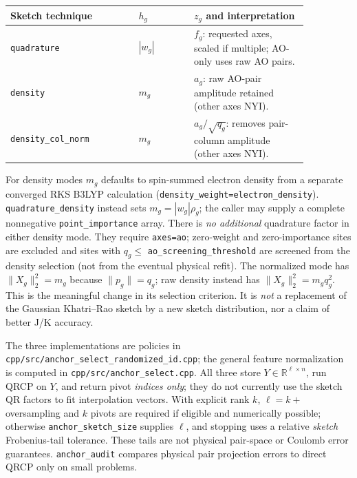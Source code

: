 \documentclass[10pt,a4paper]{article}
\newcommand{\code}[1]{\texttt{#1}}
\begin{document}
\begin{center}
\small
\begin{tabular}{@{}p{0.37\linewidth}p{0.16\linewidth}p{0.33\linewidth}@{}}
\toprule
Sketch technique & $h_g$ & $z_g$ and interpretation \\
\midrule
\code{quadrature} & $|w_g|$ & $f_g$: requested axes, scaled if multiple; AO-only uses raw AO pairs. \\
\code{density} & $m_g$ & $a_g$: raw AO-pair amplitude retained (other axes NYI). \\
\code{density\_col\_norm} & $m_g$ & $a_g/\sqrt{q_g}$: removes pair-column amplitude (other axes NYI). \\
\bottomrule
\end{tabular}
\end{center}
For density modes $m_g$ defaults to spin-summed electron density from a
separate converged RKS B3LYP calculation (\code{density\_weight=electron\_density}).
\code{quadrature\_density} instead sets $m_g=|w_g|\rho_g$; the caller may
supply a complete nonnegative \code{point\_importance} array. There is
\emph{no additional} quadrature factor in either density mode. They require
\code{axes=ao}; zero-weight and zero-importance sites are excluded and sites
with $q_g\leq$ \code{ao\_screening\_threshold} are screened from the density
selection (not from the eventual physical refit). The normalized mode has
$\|X_g\|_2^2=m_g$ because $\|p_g\|=q_g$; raw density instead has
$\|X_g\|_2^2=m_gq_g^2$. This is the meaningful change in its selection
criterion. It is \emph{not} a replacement of the Gaussian Khatri--Rao sketch
by a new sketch distribution, nor a claim of better J/K accuracy.

The three implementations are policies in
\code{cpp/src/anchor\_select\_randomized\_id.cpp}; the general feature
normalization is computed in \code{cpp/src/anchor\_select.cpp}. All three
store $Y\in\mathbb R^{\ell\times n}$, run QRCP on $Y$, and return pivot
\emph{indices only}; they do not currently use the sketch QR factors to fit
interpolation vectors. With explicit rank $k$, $\ell=k+$ oversampling and
$k$ pivots are required if eligible and numerically possible; otherwise
\code{anchor\_sketch\_size} supplies $\ell$, and stopping uses a relative
\emph{sketch} Frobenius-tail tolerance. These tails are not physical pair-space
or Coulomb error guarantees. \code{anchor\_audit} compares physical pair
projection errors to direct QRCP only on small problems.
\end{document}
